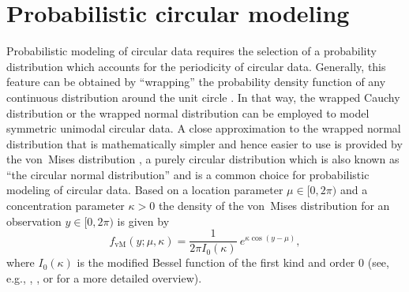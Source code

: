 \documentclass{statsoc}
\begin{document}
\section{Probabilistic circular modeling}
\label{sec:prob_circ}
Probabilistic modeling of circular data requires the selection of a probability
distribution which accounts for the periodicity of circular data. Generally,
this feature can be obtained by ``wrapping'' the probability density function
of any continuous distribution around the unit circle \citep{Mardia+Jupp:1999}.
In that way, the wrapped Cauchy distribution or the wrapped normal distribution
can be employed to model symmetric unimodal circular data. A close
approximation to the wrapped normal distribution that is mathematically simpler
and hence easier to use is provided by the von~Mises distribution
\citep{Fisher:1993}, a purely circular distribution which is also known as
``the circular normal distribution'' and is a common choice for probabilistic
modeling of circular data. Based on a location parameter $\mu \in [0, 2\pi)$
and a concentration parameter $\kappa > 0$ the density of the von~Mises
distribution for an observation $y \in [0, 2\pi)$ is given by
\begin{equation}
  f_\mathrm{vM}(y; \mu, \kappa) = \frac{1}{2 \pi I_0(\kappa)}~e^{ \kappa \cos(y - \mu)},\label{schlosser:equ_vm}
\end{equation}
where $I_0(\kappa)$ is the modified Bessel function of the first kind and order
$0$ (see, e.g., \citealt{Mardia+Zemroch:1975b}, \citealt{Jammalamadaka+Sengupta:2001}, or
\citealt{Ley+Verdebout:2017} for a more detailed overview).
\end{document}
